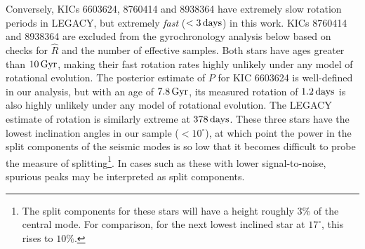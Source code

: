 \documentclass[12pt]{article}
\begin{document}
Conversely, KICs 6603624, 8760414 and 8938364 have extremely slow rotation periods in LEGACY, but extremely \textit{fast} ($<3\, \rm {days}$) in this work. KICs 8760414 and 8938364 are excluded from the gyrochronology analysis below based on checks for $\hat{R}$ and the number of effective samples. Both stars have ages greater than $10\, \rm Gyr$, making their fast rotation rates highly unlikely under any model of rotational evolution. The posterior estimate of $P$ for KIC 6603624 is well-defined in our analysis, but with an age of $7.8\, \rm Gyr$, its measured rotation of $1.2\, \rm days$ is also highly unlikely under any model of rotational evolution. The LEGACY estimate of rotation is similarly extreme at $378\, \rm days$. These three stars have the lowest inclination angles in our sample ($< 10^\circ$), at which point the power in the split components of the seismic modes is so low that it becomes difficult to probe the measure of splitting\footnote{The split components for these stars will have a height roughly 3\% of the central mode. For comparison, for the next lowest inclined star at $17^\circ$, this rises to $10\%$.}. In cases such as these with lower signal-to-noise, spurious peaks may be interpreted as split components.\\
\end{document}
